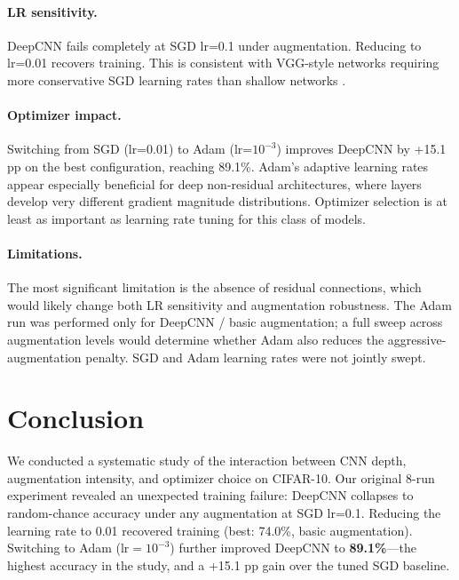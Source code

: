 \documentclass[11pt,letterpaper]{article}
\begin{document}
\paragraph{LR sensitivity.} DeepCNN fails completely at SGD lr=0.1 under augmentation.
Reducing to lr=0.01 recovers training. This is consistent with VGG-style networks requiring
more conservative SGD learning rates than shallow networks \cite{simonyanvery}.

\paragraph{Optimizer impact.} Switching from SGD (lr=0.01) to Adam (lr=$10^{-3}$) improves
DeepCNN by +15.1 pp on the best configuration, reaching 89.1\%. Adam's adaptive learning
rates appear especially beneficial for deep non-residual architectures, where layers develop
very different gradient magnitude distributions. Optimizer selection is at least as important
as learning rate tuning for this class of models.

\paragraph{Limitations.} The most significant limitation is the absence of residual
connections, which would likely change both LR sensitivity and augmentation robustness. The
Adam run was performed only for DeepCNN / basic augmentation; a full sweep across augmentation
levels would determine whether Adam also reduces the aggressive-augmentation penalty.
SGD and Adam learning rates were not jointly swept.

\section{Conclusion}

We conducted a systematic study of the interaction between CNN depth, augmentation intensity,
and optimizer choice on CIFAR-10. Our original 8-run experiment revealed an unexpected training
failure: DeepCNN collapses to random-chance accuracy under any augmentation at SGD lr=0.1.
Reducing the learning rate to 0.01 recovered training (best: 74.0\%, basic augmentation).
Switching to Adam ($\mathrm{lr}=10^{-3}$) further improved DeepCNN to \textbf{89.1\%}---the
highest accuracy in the study, and a +15.1 pp gain over the tuned SGD baseline.
\end{document}
